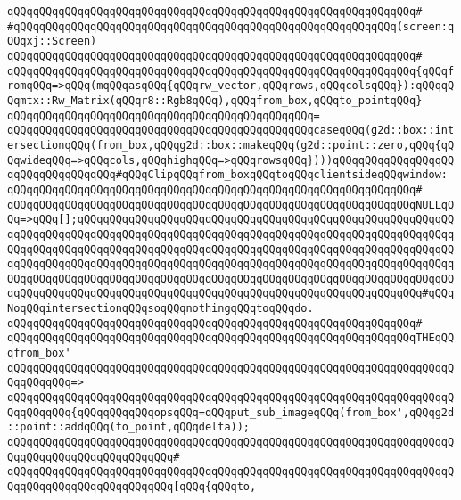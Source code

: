 \verb|qQQqqQQqqQQqqQQqqQQqqQQqqQQqqQQqqQQqqQQqqQQqqQQqqQQqqQQqqQQqqQQq#|\newline
\verb|#qQQqqQQqqQQqqQQqqQQqqQQqqQQqqQQqqQQqqQQqqQQqqQQqqQQqqQQqqQQq(screen:qQQqxj::Screen)|\newline
\verb|qQQqqQQqqQQqqQQqqQQqqQQqqQQqqQQqqQQqqQQqqQQqqQQqqQQqqQQqqQQqqQQq#|\newline
\verb|qQQqqQQqqQQqqQQqqQQqqQQqqQQqqQQqqQQqqQQqqQQqqQQqqQQqqQQqqQQqqQQq{qQQqfromqQQq=>qQQq(mqQQqasqQQq{qQQqrw_vector,qQQqrows,qQQqcolsqQQq}):qQQqqQQqmtx::Rw_Matrix(qQQqr8::Rgb8qQQq),qQQqfrom_box,qQQqto_pointqQQq}|\newline
\verb|qQQqqQQqqQQqqQQqqQQqqQQqqQQqqQQqqQQqqQQqqQQqqQQq=|\newline
\verb|qQQqqQQqqQQqqQQqqQQqqQQqqQQqqQQqqQQqqQQqqQQqqQQqcaseqQQq(g2d::box::intersectionqQQq(from_box,qQQqg2d::box::makeqQQq(g2d::point::zero,qQQq{qQQqwideqQQq=>qQQqcols,qQQqhighqQQq=>qQQqrowsqQQq})))qQQqqQQqqQQqqQQqqQQqqQQqqQQqqQQqqQQq#qQQqClipqQQqfrom_boxqQQqtoqQQqclientsideqQQqwindow:|\newline
\verb|qQQqqQQqqQQqqQQqqQQqqQQqqQQqqQQqqQQqqQQqqQQqqQQqqQQqqQQqqQQqqQQq#|\newline
\verb|qQQqqQQqqQQqqQQqqQQqqQQqqQQqqQQqqQQqqQQqqQQqqQQqqQQqqQQqqQQqqQQqNULLqQQq=>qQQq[];qQQqqQQqqQQqqQQqqQQqqQQqqQQqqQQqqQQqqQQqqQQqqQQqqQQqqQQqqQQqqQQqqQQqqQQqqQQqqQQqqQQqqQQqqQQqqQQqqQQqqQQqqQQqqQQqqQQqqQQqqQQqqQQqqQQqqQQqqQQqqQQqqQQqqQQqqQQqqQQqqQQqqQQqqQQqqQQqqQQqqQQqqQQqqQQqqQQqqQQqqQQqqQQqqQQqqQQqqQQqqQQqqQQqqQQqqQQqqQQqqQQqqQQqqQQqqQQqqQQqqQQqqQQqqQQqqQQqqQQqqQQqqQQqqQQqqQQqqQQqqQQqqQQqqQQqqQQqqQQqqQQqqQQqqQQqqQQqqQQqqQQqqQQqqQQqqQQqqQQqqQQqqQQqqQQqqQQqqQQqqQQqqQQqqQQqqQQqqQQqqQQq#qQQqNoqQQqintersectionqQQqsoqQQqnothingqQQqtoqQQqdo.|\newline
\verb|qQQqqQQqqQQqqQQqqQQqqQQqqQQqqQQqqQQqqQQqqQQqqQQqqQQqqQQqqQQqqQQq#|\newline
\verb|qQQqqQQqqQQqqQQqqQQqqQQqqQQqqQQqqQQqqQQqqQQqqQQqqQQqqQQqqQQqqQQqTHEqQQqfrom_box'|\newline
\verb|qQQqqQQqqQQqqQQqqQQqqQQqqQQqqQQqqQQqqQQqqQQqqQQqqQQqqQQqqQQqqQQqqQQqqQQqqQQqqQQq=>|\newline
\verb|qQQqqQQqqQQqqQQqqQQqqQQqqQQqqQQqqQQqqQQqqQQqqQQqqQQqqQQqqQQqqQQqqQQqqQQqqQQqqQQq{qQQqqQQqqQQqopsqQQq=qQQqput_sub_imageqQQq(from_box',qQQqg2d::point::addqQQq(to_point,qQQqdelta));|\newline
\verb|qQQqqQQqqQQqqQQqqQQqqQQqqQQqqQQqqQQqqQQqqQQqqQQqqQQqqQQqqQQqqQQqqQQqqQQqqQQqqQQqqQQqqQQqqQQqqQQq#|\newline
\verb|qQQqqQQqqQQqqQQqqQQqqQQqqQQqqQQqqQQqqQQqqQQqqQQqqQQqqQQqqQQqqQQqqQQqqQQqqQQqqQQqqQQqqQQqqQQqqQQq[qQQq{qQQqto,|\newline
